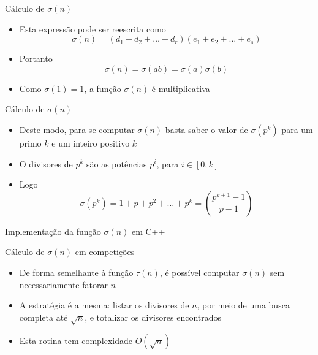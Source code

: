\begin{frame}[fragile]{Cálculo de $\sigma(n)$}

    \begin{itemize}
        \item Esta expressão pode ser reescrita como
$$
    \sigma(n) = (d_1 + d_2 + \ldots + d_r)(e_1 + e_2 + \ldots + e_s)
$$

        \item Portanto
$$
    \sigma(n) = \sigma(ab) = \sigma(a)\sigma(b)
$$

        \item Como $\sigma(1) = 1$, a função $\sigma(n)$ é multiplicativa


    \end{itemize}

\end{frame}

\begin{frame}[fragile]{Cálculo de $\sigma(n)$}

    \begin{itemize}
        \item Deste modo, para se computar $\sigma(n)$ basta saber o valor de $\sigma(p^k)$ para um primo $k$ e um inteiro positivo $k$

        \item O divisores de $p^k$ são as potências $p^i$, para $i\in [0, k]$

        \item Logo
$$
    \sigma(p^k) = 1 + p + p^2 + \ldots + p^k = \left(\frac{p^{k + 1} - 1}{p - 1}\right)
$$
    \end{itemize}

\end{frame}

\begin{frame}[fragile]{Implementação da função $\sigma(n)$ em C++}
\end{frame}

\begin{frame}[fragile]{Cálculo de $\sigma(n)$ em competições}

    \begin{itemize}
        \item De forma semelhante à função $\tau(n)$, é possível computar $\sigma(n)$ sem necessariamente fatorar $n$

        \item A estratégia é a mesma: listar os divisores de $n$, por meio de uma busca completa até $\sqrt{n}$, e totalizar os divisores encontrados

        \item Esta rotina tem complexidade $O(\sqrt{n})$
    \end{itemize}

\end{frame}

